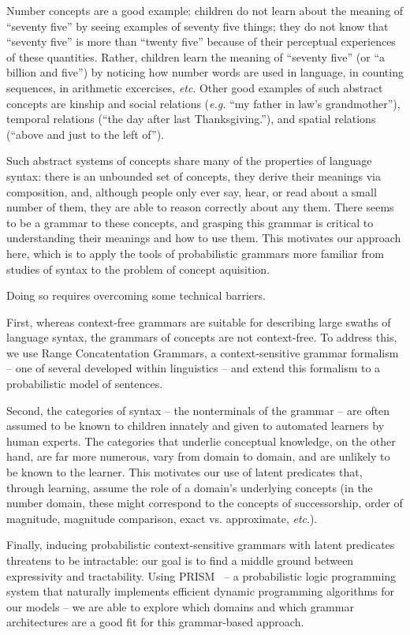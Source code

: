 \documentclass[10pt, twocolumn]{article}
\begin{document}
Number concepts are a good example: children do not learn about the
meaning of ``seventy five'' by seeing examples of seventy five things;
they do not know that ``seventy five'' is more than ``twenty five''
because of their perceptual experiences of these quantities. Rather,
children learn the meaning of ``seventy five'' (or ``a billion and
five'') by noticing how number words are used in language, in counting
sequences, in arithmetic excercises, {\it etc}. Other good examples of such
abstract concepts are kinship and social relations ({\it e.g.} ``my father
in law's grandmother''), temporal relations (``the day after last
Thanksgiving.''), and spatial relations (``above and just to the left
of'').

Such abstract systems of concepts share many of the properties of
language syntax: there is an unbounded set of concepts, they derive
their meanings via composition, and, although people only ever say,
hear, or read about a small number of them, they are able to reason
correctly about any them. There seems to be a grammar to these
concepts, and grasping this grammar is critical to understanding their
meanings and how to use them. This motivates our approach here, which
is to apply the tools of probabilistic grammars more familiar from
studies of syntax to the problem of concept aquisition.

Doing so requires overcoming some technical barriers.

First, whereas context-free grammars are suitable for describing large
swaths of language syntax, the grammars of concepts are not
context-free. To address this, we use Range Concatentation Grammars, a
context-sensitive grammar formalism -- one of several developed within
linguistics -- and extend this formalism to a probabilistic model of
sentences. 

Second, the categories of syntax -- the nonterminals of the grammar --
are often assumed to be known to children innately and given to
automated learners by human experts. The categories that underlie
conceptual knowledge, on the other hand, are far more numerous, vary
from domain to domain, and are unlikely to be known to the
learner. This motivates our use of latent predicates that, through
learning, assume the role of a domain's underlying concepts (in the
number domain, these might correspond to the concepts of
successorship, order of magnitude, magnitude comparison, exact
vs. approximate, {\it etc}.).

Finally, inducing probabilistic context-sensitive grammars with latent
predicates threatens to be intractable: our goal is to find a
middle ground between expressivity and tractability. Using
PRISM~\cite{DBLP:journals/jair/SatoK01} -- a probabilistic logic programming system that naturally
implements efficient dynamic programming algorithms for our models --
we are able to explore which domains and which grammar architectures
are a good fit for this grammar-based approach.
\end{document}
